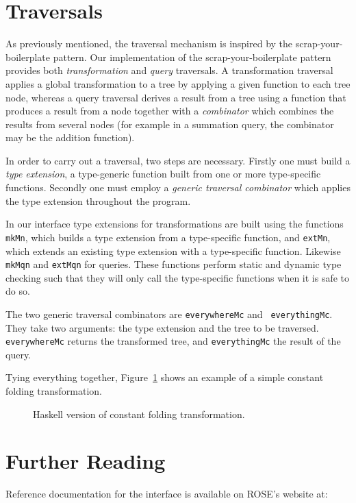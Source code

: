 \section{Traversals}

As previously mentioned, the traversal mechanism is inspired by
the scrap-your-boilerplate pattern.  Our implementation of the
scrap-your-boilerplate pattern provides both {\em transformation} and
{\em query} traversals.  A transformation traversal applies a global
transformation to a tree by applying a given function to each tree
node, whereas a query traversal derives a result from a tree using
a function that produces a result from a node together with a {\em
combinator} which combines the results from several nodes (for example
in a summation query, the combinator may be the addition function).

In order to carry out a traversal, two steps are necessary. Firstly
one must build a {\em type extension}, a type-generic function built
from one or more type-specific functions.  Secondly one must employ
a {\em generic traversal combinator} which applies the type extension
throughout the program.

In our interface type extensions for transformations are built
using the functions {\tt mkMn}, which builds a type extension from
a type-specific function, and {\tt extMn}, which extends an existing
type extension with a type-specific function.  Likewise {\tt mkMqn}
and {\tt extMqn} for queries.  These functions perform static and
dynamic type checking such that they will only call the type-specific
functions when it is safe to do so.

The two generic traversal combinators are {\tt everywhereMc} and {\tt
everythingMc}.  They take two arguments: the type extension and the
tree to be traversed. {\tt everywhereMc} returns the transformed tree,
and {\tt everythingMc} the result of the query.

Tying everything together, Figure~\ref{Tutorial:haskellSimplify}
shows an example of a simple constant folding transformation.

\begin{figure}[!h]
{\indent
{\mySmallFontSize

\begin{latexonly}
   
\end{latexonly}

\begin{htmlonly}
   
\end{htmlonly}

}
}
\caption{Haskell version of constant folding transformation.}
\label{Tutorial:haskellSimplify}
\end{figure}

\section{Further Reading}

Reference documentation for the interface is available on ROSE's
website at:


